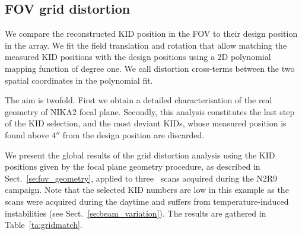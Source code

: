 \subsection{FOV grid distortion}
\label{se:grid_distortion}

We compare the reconstructed KID position in the FOV to their design
position in the array. We fit the field translation and rotation that allow
matching the measured KID positions with the design positions using a 2D
polynomial mapping function of degree one. We call distortion cross-terms
between the two spatial coordinates in the polynomial fit.

The aim is twofold. First we obtain a detailed
characterisation of the real geometry of NIKA2 focal plane. Secondly,
this analysis constitutes the last step of the KID
selection, and the most deviant KIDs, whose measured position is found
above $4''$ from the design position are discarded. 


We present the global results of the grid distortion
analysis using the KID positions given
by the focal plane geometry procedure, as described in
Sect.~\ref{se:fov_geometry}, applied to three \bm\ scans acquired
during the N2R9 campaign. Note that the selected KID numbers are low
in this example as the scans were acquired during the daytime
and suffers from temperature-induced instabilities (see
Sect.~\ref{se:beam_variation}).
The results are gathered in Table~\ref{ta:gridmatch}.

